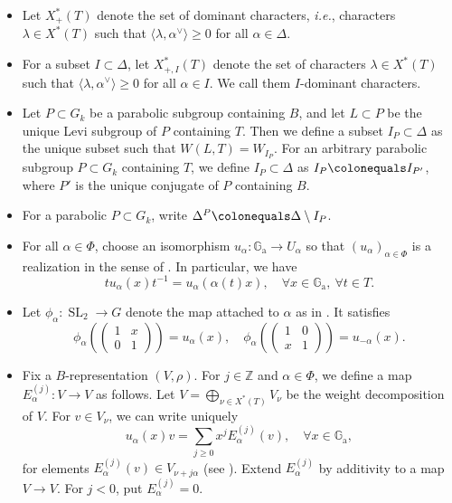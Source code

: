 \documentclass[11pt]{amsart}
\numberwithin{equation}{section}
\theoremstyle{definition}
\theoremstyle{remark}
\newcommand{\GG}{\mathbb{G}}
\newcommand{\ZZ}{\mathbb{Z}}
\DeclareMathOperator{\SL}{SL}
\begin{document}
\begin{itemize}
\item Let $X_{+}^*(T)$ denote the set of dominant characters, \textit{i.e.}, characters $\lambda\in X^*(T)$ such that $\langle \lambda,\alpha^\vee \rangle \geq 0$ for all $\alpha \in \Delta$.
\item For a subset $I\subset \Delta$, let $X_{+,I}^*(T)$ denote the set of characters $\lambda\in X^*(T)$ such that $\langle \lambda,\alpha^\vee \rangle \geq 0$ for all $\alpha \in I$. We call them $I$-dominant characters.
\item Let $P\subset G_k$ be a parabolic subgroup containing $B$, and let $L\subset P$ be the unique Levi subgroup of $P$ containing $T$. Then we define a subset $I_P\subset \Delta$ as the unique subset such that $W(L,T)=W_{I_P}$. For an arbitrary parabolic subgroup $P\subset G_k$ containing $T$, we define $I_P\subset \Delta$ as $I_P \colonequals I_{P'}$, where $P'$ is the unique conjugate of $P$ containing $B$.
\item For a parabolic $P\subset G_k$, write $\Delta^P \colonequals \Delta \setminus I_P$.
\item For all $\alpha\in \Phi$, choose an isomorphism $u_\alpha\colon \GG_{\mathrm{a}}\to U_\alpha$ so that 
  $(u_{\alpha})_{\alpha \in \Phi}$ is a realization in the sense of \cite[Section~8.1.4]{Springer-Linear-Algebraic-Groups-book}.
  In particular, we have 
\begin{equation}\label{eq:phiconj}
 t u_{\alpha}(x)t^{-1}=u_{\alpha}(\alpha(t)x), \quad \forall x\in \GG_{\mathrm{a}},\  \forall t\in T.
\end{equation}
\item Let $\phi_{\alpha}\colon \SL_2\to G$ denote the map attached to $\alpha$ as in \cite[Proof of Lemma~9.2.2]{Springer-Linear-Algebraic-Groups-book}.
  It satisfies
\[
 \phi_\alpha 
 \left( \begin{pmatrix}
 1 & x \\ 0 & 1 
 \end{pmatrix}\right) = u_{\alpha}(x), \quad 
 \phi_\alpha 
 \left( \begin{pmatrix}
 1 & 0 \\ x & 1 
 \end{pmatrix}\right) = u_{-\alpha}(x).
\]
\item Fix a $B$-representation $(V,\rho)$. For $j\in \ZZ$ and $\alpha\in \Phi$, we define a map $E_{\alpha}^{(j)} \colon V \to V$ as follows. Let $V=\bigoplus_{\nu \in X^*(T)}V_\nu$ be the weight decomposition of $V$. For $v\in V_\nu$, we can write uniquely
\[
 u_{\alpha}(x)v=\sum_{j \geq 0} x^j E_{\alpha}^{(j)}(v), \quad \forall x\in \GG_{\mathrm{a}},
\]
for elements $E_{\alpha}^{(j)}(v) \in V_{\nu+j\alpha}$ (see \cite[Lemma 3.3.1]{Imai-Koskivirta-vector-bundles}). Extend $E_{\alpha}^{(j)}$ by additivity to a map $V\to V$. For $j<0$, put $E_{\alpha}^{(j)}=0$. 
\end{itemize}
\end{document}
